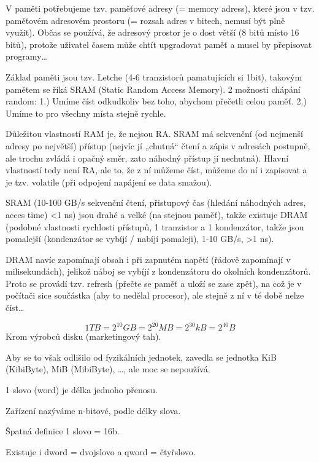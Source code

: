 \documentclass[12pt]{article}					%
\begin{document}
        \begin{priklady}
            V paměti potřebujeme tzv. paměťové adresy (= memory adress), které jsou v tzv. paměťovém adresovém prostoru (= rozsah adres v bitech, nemusí být plně využit). Občas se používá, že adresový prostor je o dost větší (8 bitů místo 16 bitů), protože uživatel časem může chtít upgradovat paměť a musel by přepisovat programy…

            Základ paměti jsou tzv. Letche (4-6 tranzistorů pamatujících si 1bit), takovým pamětem se říká SRAM (Static Random Access Memory). 2 možnosti chápání random: 1.) Umíme číst odkudkoliv bez toho, abychom přečetli celou paměť. 2.) Umíme to pro všechny místa stejně rychle.

            Důležitou vlastností RAM je, že nejsou RA. SRAM má sekvenční (od nejmenší adresy po největší) přístup (nejvíc jí „chutná“ čtení a zápis v adresách postupně, ale trochu zvládá i opačný směr, zato náhodný přístup jí nechutná). Hlavní vlastností tedy není RA, ale to, že z ní můžeme číst, můžeme do ní i zapisovat a je tzv. volatile (při odpojení napájení se data smažou).

            SRAM (10-100 GB/s sekvenční čtení, přistupový čas (hledání náhodných adres, acces time) <1 ns) jsou drahé a velké (na stejnou paměť), takže existuje DRAM (podobné vlastnosti rychlosti přístupů, 1 tranzistor a 1 kondenzátor, takže jsou pomalejší (kondenzátor se vybíjí / nabíjí pomaleji), 1-10 GB/s, >1 ns).

            DRAM navíc zapomínají obsah i při zapnutém napětí (řádově zapomínají v milisekundách), jelikož náboj se vybíjí z kondenzátoru do okolních kondenzátorů. Proto se provádí tzv. refresh (přečte se paměť a uloží se zase zpět), na což je v počítači sice součástka (aby to nedělal procesor), ale stejně z ní v té době nelze číst…


        \end{priklady}

        \begin{definice}[kB, MB, GB, TB]
            $$ 1TB = 2^{10}GB = 2^{20}MB = 2^{30}kB = 2^{40}B $$
            Krom výrobců disku (marketingový tah).

            Aby se to však odlišilo od fyzikálních jednotek, zavedla se jednotka KiB (KibiByte), MiB (MibiByte), …, ale moc se nepoužívá.
        \end{definice}

        \begin{definice}[Word]
            1 slovo (word) je délka jednoho přenosu.

            Zařízení nazýváme n-bitové, podle délky slova.

            Špatná definice 1 slovo = 16b.

            Existuje i dword = dvojslovo a qword = čtyřslovo.
        \end{definice}
\end{document}
